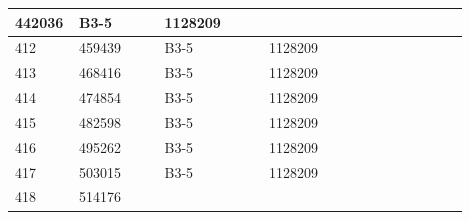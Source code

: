 \documentclass[UTF8,10pt,a4paper,fontset=fandol]{ctexart}
\newcommand{\fieldvalue}[1]{#1}
\begin{document}
\begin{center}
\begin{tabular}{|p{0.08\linewidth}|p{0.18\linewidth}|p{0.22\linewidth}|p{0.22\linewidth}|p{0.20\linewidth}|}
\fieldvalue{442036} &
\fieldvalue{B3-5} &
\fieldvalue{1128209} & \\ \hline
\fieldvalue{412} &
\fieldvalue{459439} &
\fieldvalue{B3-5} &
\fieldvalue{1128209} & \\ \hline
\fieldvalue{413} &
\fieldvalue{468416} &
\fieldvalue{B3-5} &
\fieldvalue{1128209} & \\ \hline
\fieldvalue{414} &
\fieldvalue{474854} &
\fieldvalue{B3-5} &
\fieldvalue{1128209} & \\ \hline
\fieldvalue{415} &
\fieldvalue{482598} &
\fieldvalue{B3-5} &
\fieldvalue{1128209} & \\ \hline
\fieldvalue{416} &
\fieldvalue{495262} &
\fieldvalue{B3-5} &
\fieldvalue{1128209} & \\ \hline
\fieldvalue{417} &
\fieldvalue{503015} &
\fieldvalue{B3-5} &
\fieldvalue{1128209} & \\ \hline
\fieldvalue{418} &
\fieldvalue{514176} &

\end{tabular}
\end{center}
\end{document}
